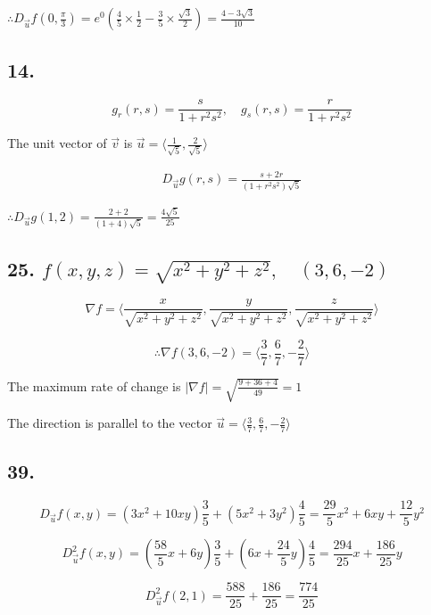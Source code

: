 \documentclass{article}
\begin{document}
  $\therefore D_{\overrightarrow u}f(0, \frac \pi 3) = e^0 (\frac 4 5 \times \frac 1 2 - \frac 3 5 \times \frac{\sqrt 3}{2}) = \frac{4-3\sqrt 3}{10}$

  \subsection*{14. }

  $$g_r(r, s) = \frac{s}{1+r^2s^2}, \quad g_s(r, s) = \frac{r}{1 + r^2s^2}$$

  The unit vector of $\overrightarrow v$ is $\overrightarrow u = \langle  \frac{1}{\sqrt 5}, \frac{2}{\sqrt 5}  \rangle$

  $$\begin{aligned}
    D_{\overrightarrow u}g(r, s) = \frac{s + 2r}{(1+r^2s^2) \sqrt 5}
  \end{aligned}$$
  
  $\therefore D_{\overrightarrow u}g(1, 2) = \frac{2 + 2}{(1+4)\sqrt 5} = \frac{4\sqrt 5}{25}$

  \subsection*{25. $f(x, y, z) = \sqrt{x^2+y^2+z^2}, \quad (3, 6, -2)$}

  $$\nabla f = \langle \frac{x}{\sqrt{x^2+y^2+z^2}}, \frac{y}{\sqrt{x^2+y^2+z^2}}, \frac{z}{\sqrt{x^2+y^2+z^2}}  \rangle $$

  $$\therefore \nabla f(3, 6, -2) = \langle \frac{3}{7}, \frac 6 7, -\frac 2 7  \rangle $$

  The maximum rate of change is $|\nabla f| = \sqrt{\frac{9+36+4}{49}} = 1$

  The direction is parallel to the vector $\overrightarrow u = \langle \frac 3 7, \frac 6 7, -\frac 2 7 \rangle$

  \subsection*{39. }

  $$D_{\overrightarrow u}f(x, y) = (3x^2+10xy) \frac 3 5  + (5x^2 + 3y^2)\frac 4 5 = \frac{29}{5}x^2 + 6xy + \frac{12}{5}y^2$$

  $$D^2 _{\overrightarrow u}f(x, y) = (\frac{58}{5}x + 6y)\frac{3}{5} + (6x + \frac{24}{5}y) \frac 4 5 = \frac{294}{25}x + \frac{186}{25}y$$

  $$D^2 _{\overrightarrow u}f(2, 1) = \frac{588}{25} + \frac{186}{25} = \frac{774}{25}$$
\end{document}
